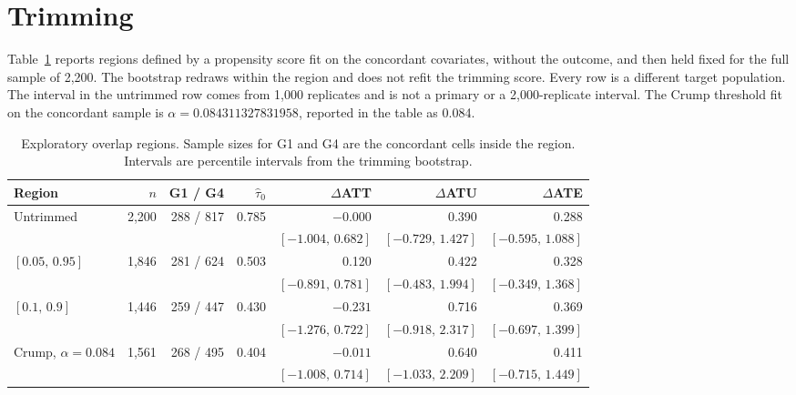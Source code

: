 \documentclass[11pt]{article}
\begin{document}
\section{Trimming}
\label{sec:trim}

Table~\ref{tab:trim} reports regions defined by a propensity score fit on the concordant covariates, without the outcome, and then held fixed for the full sample of 2{,}200. The bootstrap redraws within the region and does not refit the trimming score. Every row is a different target population. The interval in the untrimmed row comes from 1{,}000 replicates and is not a primary or a 2{,}000-replicate interval. The Crump threshold fit on the concordant sample is $\alpha=0.084311327831958$, reported in the table as 0.084.

\begin{table}[ht]
\centering
\caption{Exploratory overlap regions. Sample sizes for G1 and G4 are the concordant cells inside the region. Intervals are percentile intervals from the trimming bootstrap.}
\label{tab:trim}
\small
\begin{tabular}{lrrrrrr}
\toprule
Region & $n$ & G1 / G4 & $\widehat\tau_0$ & $\Delta$ATT & $\Delta$ATU & $\Delta$ATE \\
\midrule
Untrimmed & 2{,}200 & 288 / 817 & 0.785 & $-0.000$ & 0.390 & 0.288 \\
 & & & & $[-1.004,\,0.682]$ & $[-0.729,\,1.427]$ & $[-0.595,\,1.088]$ \\
$[0.05,\,0.95]$ & 1{,}846 & 281 / 624 & 0.503 & 0.120 & 0.422 & 0.328 \\
 & & & & $[-0.891,\,0.781]$ & $[-0.483,\,1.994]$ & $[-0.349,\,1.368]$ \\
$[0.1,\,0.9]$ & 1{,}446 & 259 / 447 & 0.430 & $-0.231$ & 0.716 & 0.369 \\
 & & & & $[-1.276,\,0.722]$ & $[-0.918,\,2.317]$ & $[-0.697,\,1.399]$ \\
Crump, $\alpha=0.084$ & 1{,}561 & 268 / 495 & 0.404 & $-0.011$ & 0.640 & 0.411 \\
 & & & & $[-1.008,\,0.714]$ & $[-1.033,\,2.209]$ & $[-0.715,\,1.449]$ \\
\bottomrule
\end{tabular}
\end{table}



\end{document}
